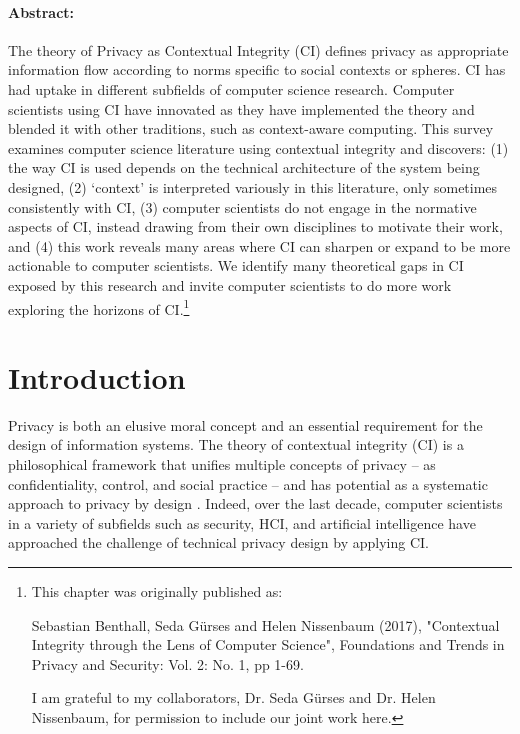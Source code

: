 \documentclass[../thesis.tex]{subfiles}
\begin{document}
 \paragraph{Abstract:}
 The theory of Privacy as Contextual Integrity (CI) defines
 privacy as appropriate information flow according to norms
 specific to social contexts or spheres.
 CI has had uptake in different subfields of
 computer science research. Computer scientists using CI
 have innovated as they have implemented the theory and
 blended it with other traditions, such as context-aware
 computing. This survey examines
 computer science literature using contextual integrity and
 discovers:  (1) the way CI is used depends on the technical
 architecture of the system being designed, (2) `context' is
 interpreted variously in this literature, only sometimes
 consistently with CI, (3) computer scientists do not engage
 in the normative aspects of CI, instead drawing from their
 own disciplines to motivate their work, and (4) this work
 reveals many areas where CI can sharpen or expand to be
 more actionable to computer scientists. We identify many
 theoretical gaps in CI exposed by this research and invite
 computer scientists to do more work exploring the horizons
 of CI.\footnote{This chapter was originally published as:

 Sebastian Benthall, Seda G{\"u}rses and Helen Nissenbaum (2017), "Contextual Integrity through the Lens of Computer Science", Foundations and Trends\textsuperscript{\textregistered} in Privacy and Security: Vol. 2: No. 1, pp 1-69.

 I am grateful to my collaborators, Dr. Seda G{\"u}rses and Dr. Helen Nissenbaum, for permission to include our joint work here.}
 

\section{Introduction}
\label{CI1}

Privacy is both an elusive moral concept and an essential requirement
for the design of information systems. The theory of contextual
integrity (CI) is a philosophical framework that unifies multiple
concepts of privacy -- as confidentiality, control, and social
practice \citep{gurses2013two} -- and has potential as a
systematic approach to privacy by design \citep{nissenbaum2009privacy}. Indeed,
over the last decade, computer scientists in a variety of subfields
such as security, HCI, and artificial intelligence have approached the
challenge of technical privacy design by applying CI.
\end{document}
